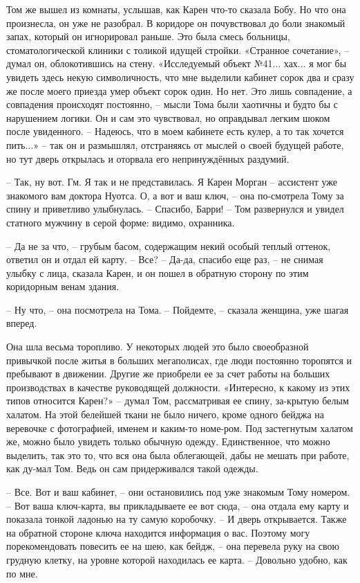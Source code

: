 Том же вышел из комнаты, услышав, как Карен что-то сказала Бобу. Но что она произнесла, он уже не разобрал. В коридоре он почувствовал до боли знакомый запах, который он игнорировал раньше. Это была смесь больницы, стоматологической клиники с толикой идущей стройки. «Странное сочетание», – думал он, облокотившись на стену. «Исследуемый объект №41... хах... я мог бы увидеть здесь некую символичность, что мне выделили кабинет сорок два и сразу же после моего приезда умер объект сорок один. Но нет. Это лишь совпадение, а совпадения происходят постоянно, – мысли Тома были хаотичны и будто бы с нарушением логики. Он и сам это чувствовал, но оправдывал легким шоком после увиденного. – Надеюсь, что в моем кабинете есть кулер, а то так хочется пить...» – так он и размышлял, отстраняясь от мыслей о своей будущей работе, но тут дверь открылась и оторвала его непринуждённых раздумий.

– Так, ну вот. Гм. Я так и не представилась. Я Карен Морган – ассистент уже знакомого вам доктора Нуотса. О, а вот и ваш ключ, – она по-смотрела Тому за спину и приветливо улыбнулась. – Спасибо, Барри! – Том развернулся и увидел статного мужчину в серой форме: видимо, охранника.

– Да не за что, – грубым басом, содержащим некий особый теплый оттенок, ответил он и отдал ей карту. – Все? 
– Да-да, спасибо еще раз, –  не снимая улыбку с лица, сказала Карен, и он пошел в обратную сторону по этим коридорным венам здания. 

– Ну что, – она посмотрела на Тома. – Пойдемте, – сказала женщина, уже шагая вперед. 

Она шла весьма торопливо. У некоторых людей это было своеобразной привычкой после житья в больших мегаполисах, где люди постоянно торопятся и пребывают в движении. Другие же приобрели ее за счет работы на больших производствах в качестве руководящей должности. «Интересно, к какому из этих типов относится Карен?» – думал Том, рассматривая ее спину, за-крытую белым халатом. На этой белейшей ткани не было ничего, кроме одного бейджа на веревочке с фотографией, именем и каким-то номе-ром. Под застегнутым халатом же, можно было увидеть только обычную одежду. Единственное, что можно выделить, так это то, что вся она была облегающей, дабы не мешать при работе, как ду-мал Том. Ведь он сам придерживался такой одежды.   

– Все. Вот и ваш кабинет, – они остановились под уже знакомым Тому номером. – Вот ваша ключ-карта, вы прикладываете ее вот сюда, – она отдала ему карту и показала тонкой ладонью на ту самую коробочку. – И дверь открывается. Также на обратной стороне ключа находится информация о вас. Поэтому могу порекомендовать повесить ее на шею, как бейдж, – она перевела руку на свою грудную клетку, на уровне которой находилась ее карта. – Довольно удобно, как по мне. 

